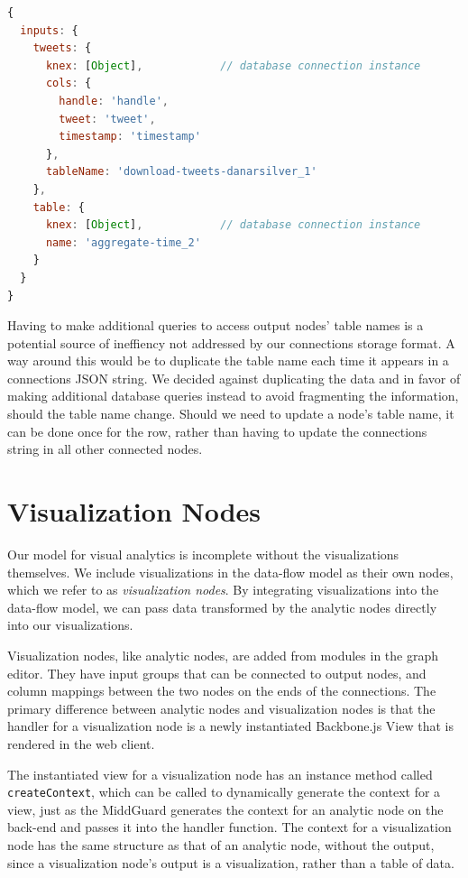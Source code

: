 \documentclass[midd]{thesis}
\begin{document}
\begin{lstlisting}[language=javascript, caption={The context passed into a ``Time by Day/Hour'' node's handler function.}, captionpos=b, label={lst:nodecontext}]
{
  inputs: {
    tweets: {
      knex: [Object],            // database connection instance
      cols: {
        handle: 'handle',
        tweet: 'tweet',
        timestamp: 'timestamp'
      },
      tableName: 'download-tweets-danarsilver_1'
    },
    table: {
      knex: [Object],            // database connection instance
      name: 'aggregate-time_2'
    }
  }
}
\end{lstlisting}

Having to make additional queries to access output nodes' table names is a
potential source of ineffiency not addressed by our connections storage format.
A way around this would be to duplicate the table name each time it appears in a
connections JSON string. We decided against duplicating the data and in favor of
making additional database queries instead to avoid fragmenting the information,
should the table name change. Should we need to update a node's table name, it
can be done once for the row, rather than having to update the connections
string in all other connected nodes.

\section{Visualization Nodes}

Our model for visual analytics is incomplete without the visualizations
themselves. We include visualizations in the data-flow model as their own nodes,
which we refer to as \textit{visualization nodes}. By integrating visualizations
into the data-flow model, we can pass data transformed by the analytic nodes
directly into our visualizations.

Visualization nodes, like analytic nodes, are added from modules in the graph
editor. They have input groups that can be connected to output nodes, and column
mappings between the two nodes on the ends of the connections. The primary
difference between analytic nodes and visualization nodes is that the handler
for a visualization node is a newly instantiated Backbone.js View
\cite{backbone} that is rendered in the web client.

The instantiated view for a visualization node has an instance method called\\
\texttt{createContext}, which can be called to dynamically generate the context
for a view, just as the MiddGuard generates the context for an analytic node on
the back-end and passes it into the handler function. The context for a
visualization node has the same structure as that of an analytic node, without
the output, since a visualization node's output is a visualization, rather than
a table of data.
\end{document}
